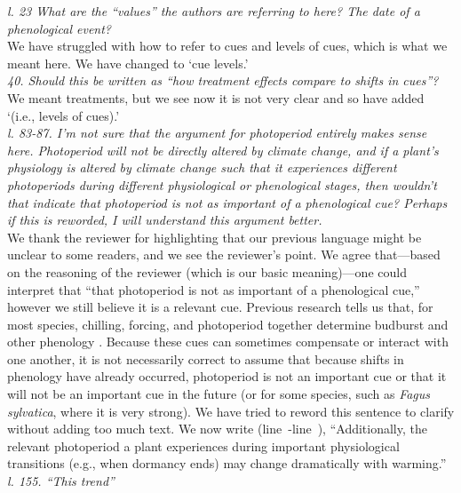 \documentclass[11pt,letter]{article}
\newcommand{\lr}[1]{line~\lineref{#1}}
\begin{document}
\emph{l. 23 What are the “values” the authors are referring to here? The date of a phenological event? }\\

We have struggled with how to refer to cues and levels of cues, which is what we meant here. We have changed to `cue levels.'\\

\emph{40. Should this be written as “how treatment effects compare to shifts in cues”? }\\

We meant treatments, but we see now it is not very clear and so have added `(i.e., levels of cues).'\\

\emph{l. 83-87. I'm not sure that the argument for photoperiod entirely makes sense here. Photoperiod will not be directly altered by climate change, and if a plant's physiology is altered by climate change such that it experiences different photoperiods during different physiological or phenological stages, then wouldn't that indicate that photoperiod is not as important of a phenological cue? Perhaps if this is reworded, I will understand this argument better. }\\

We thank the reviewer for highlighting that our previous language might be unclear to some readers, and we see the reviewer's point. We agree that---based on the reasoning of the reviewer (which is our basic meaning)---one could interpret that ``that photoperiod is not as important of a phenological cue,'' however we still believe it is a relevant cue. Previous research tells us that, for most species, chilling, forcing, and photoperiod together determine budburst and other phenology \citep{ospreephoto}. Because these cues can sometimes compensate or interact with one another, it is not necessarily correct  to assume that because shifts in phenology have already occurred, photoperiod is not an important cue or that it will not be an important cue in the future (or for some species, such as \emph{Fagus sylvatica}, where it is very strong). We have tried to reword this sentence to clarify without adding too much text. We now write (\lr{r3photochange}-\lr{r3photochangeend}), ``Additionally, the relevant photoperiod a plant experiences during important physiological transitions (e.g., when dormancy ends) may change dramatically with warming.''\\

\emph{l. 155. “This trend”}\\
\end{document}
